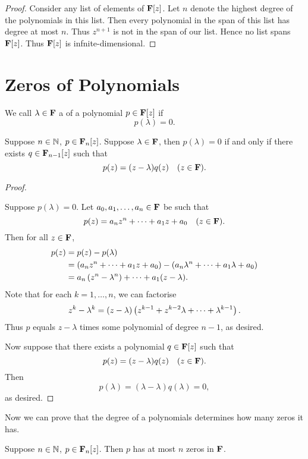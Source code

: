 \begin{proof}
Consider any list of elements of $\mathbf F[z]$. Let $n$ denote the highest degree of the polynomials in this list. Then every polynomial in the span of this list has degree at most $n$. Thus $z^{n+1}$ is not in the span of our list. Hence no list spans $\mathbf F[z]$. Thus $\mathbf F[z]$ is infnite-dimensional.
\end{proof}
\pagebreak

\section{Zeros of Polynomials}
\begin{definition}
We call $\lambda\in\mathbf F$ a  of a polynomial $p\in\mathbf F[z]$ if
\[p(\lambda)=0.\]
\end{definition}

\begin{lemma}\label{lemma:factor-theorem}
Suppose $n\in\mathbb N$, $p\in\mathbf F_n[z]$. Suppose $\lambda\in\mathbf F$, then $p(\lambda)=0$ if and only if there exists $q\in\mathbf F_{n-1}[z]$ such that
\[p(z)=(z-\lambda)q(z)\quad(z\in\mathbf F).\]
\end{lemma}

\begin{proof} \

\fbox{$\implies$} Suppose $p(\lambda)=0$. Let $a_0,a_1,\dots,a_n\in\mathbf F$ be such that
\[p(z)=a_nz^n+\cdots+a_1z+a_0\quad(z\in\mathbf F).\]
Then for all $z\in\mathbf F$,
\begin{align*}
p(z)&=p(z)-p(\lambda)\\
&=\left(a_nz^n+\cdots+a_1z+a_0\right)-\left(a_n\lambda^n+\cdots+a_1\lambda+a_0\right)\\
&=a_n\left(z^n-\lambda^n\right)+\cdots+a_1(z-\lambda).
\end{align*}
Note that for each $k=1,\dots,n$, we can factorise
\[z^k-\lambda^k=(z-\lambda)\left(z^{k-1}+z^{k-2}\lambda+\cdots+\lambda^{k-1}\right).\]
Thus $p$ equals $z-\lambda$ times some polynomial of degree $n-1$, as desired.

\fbox{$\impliedby$} Now suppose that there exists a polynomial $q\in\mathbf F[z]$ such that
\[p(z)=(z-\lambda)q(z)\quad(z\in\mathbf F).\]
Then
\[p(\lambda)=(\lambda-\lambda)q(\lambda)=0,\]
as desired.
\end{proof}

Now we can prove that the degree of a polynomials determines how many zeros it has.

\begin{proposition}
Suppose $n\in\mathbb N$, $p\in\mathbf F_n[z]$. Then $p$ has at most $n$ zeros in $\mathbf F$.
\end{proposition}

